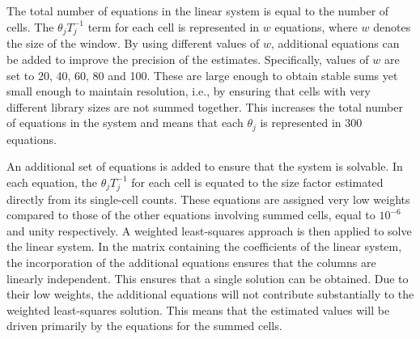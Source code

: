 \documentclass{bmcart}
\begin{document}

The total number of equations in the linear system is equal to the number of cells.
The $\theta_jT_j^{-1}$ term for each cell is represented in $w$ equations, where $w$ denotes the size of the window.
By using different values of $w$, additional equations can be added to improve the precision of the estimates. 
Specifically, values of $w$ are set to 20, 40, 60, 80 and 100.
These are large enough to obtain stable sums yet small enough to maintain resolution, i.e., by ensuring that cells with very different library sizes are not summed together.
This increases the total number of equations in the system and means that each $\theta_j$ is represented in 300 equations. 

An additional set of equations is added to ensure that the system is solvable.
In each equation, the $\theta_jT_j^{-1}$ for each cell is equated to the size factor estimated directly from its single-cell counts.
These equations are assigned very low weights compared to those of the other equations involving summed cells, equal to $10^{-6}$ and unity respectively.
A weighted least-squares approach is then applied to solve the linear system.
In the matrix containing the coefficients of the linear system, the incorporation of the additional equations ensures that the columns are linearly independent.
This ensures that a single solution can be obtained.
Due to their low weights, the additional equations will not contribute substantially to the weighted least-squares solution.
This means that the estimated values will be driven primarily by the equations for the summed cells.
\end{document}

